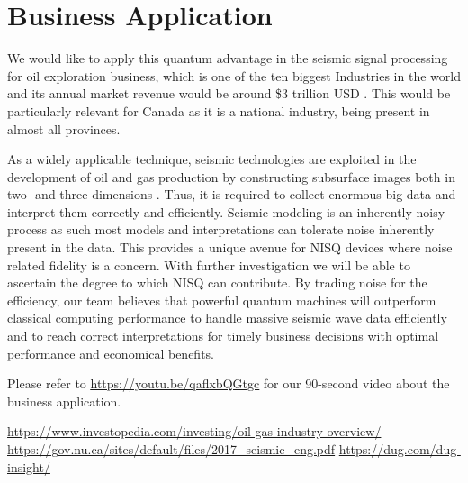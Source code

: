 \documentclass[12pt]{article}
\begin{document}
\section*{Business Application}

We would like to apply this quantum advantage in the seismic signal processing for oil exploration business, which is one of the ten biggest Industries in the world and its annual market revenue would be around \$3 trillion USD \cite{oil_industry}. This would be particularly relevant for Canada as it is a national industry, being present in almost all provinces. 

As a widely applicable technique, seismic technologies are exploited in the development of oil and gas production by constructing subsurface images both in two- and three-dimensions \cite{subsurface_img, dug}. Thus, it is required to collect enormous big data and interpret them correctly and efficiently. 
Seismic modeling is an inherently noisy process as such most models and interpretations can tolerate noise inherently present in the data. This provides a unique avenue for NISQ devices where noise related fidelity is a concern. With further investigation we will be able to ascertain the degree to which NISQ can contribute. 
By trading noise for the efficiency, our team believes that powerful quantum machines will outperform classical computing performance to handle massive seismic wave data efficiently and to reach correct interpretations for timely business decisions with optimal performance and economical benefits.

Please refer to \href{https://youtu.be/qaflxbQGtgc}{\underline{https://youtu.be/qaflxbQGtgc}} for our 90-second video about the business application.

\begin{thebibliography}{10}

 \href{https://www.investopedia.com/investing/oil-gas-industry-overview/}{https://www.investopedia.com/investing/oil-gas-industry-overview/}
 \href{https://gov.nu.ca/sites/default/files/2017_seismic_eng.pdf}{https://gov.nu.ca/sites/default/files/2017\_seismic\_eng.pdf}
 \href{https://dug.com/dug-insight/}{https://dug.com/dug-insight/}

\end{thebibliography}
\end{document}
